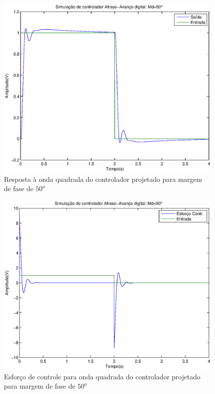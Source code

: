 \documentclass{article}
\begin{document}
\begin{figure}[H]
	\centering
	\includegraphics[width=0.8\linewidth]{yr50}
	\caption{Resposta à onda quadrada do controlador projetado para margem de fase de $50^o$}
	\label{fig:yr50}
\end{figure}
\begin{figure}[H]
	\centering
	\includegraphics[width=0.8\linewidth]{ur50}
	\caption{Esforço de controle para onda quadrada do controlador projetado para margem de fase de $50^o$}
	\label{fig:ur50}
\end{figure}
\end{document}
